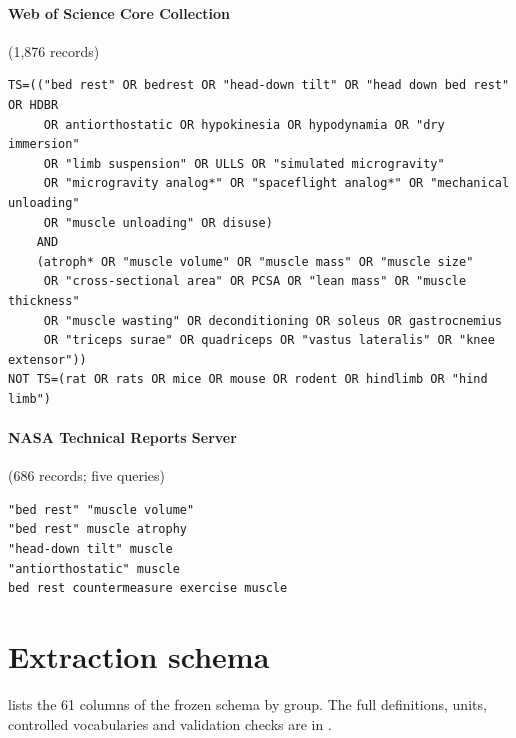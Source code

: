 \paragraph{Web of Science Core Collection} (1,876 records)
{\footnotesize
\begin{verbatim}
TS=(("bed rest" OR bedrest OR "head-down tilt" OR "head down bed rest" OR HDBR
     OR antiorthostatic OR hypokinesia OR hypodynamia OR "dry immersion"
     OR "limb suspension" OR ULLS OR "simulated microgravity"
     OR "microgravity analog*" OR "spaceflight analog*" OR "mechanical unloading"
     OR "muscle unloading" OR disuse)
    AND
    (atroph* OR "muscle volume" OR "muscle mass" OR "muscle size"
     OR "cross-sectional area" OR PCSA OR "lean mass" OR "muscle thickness"
     OR "muscle wasting" OR deconditioning OR soleus OR gastrocnemius
     OR "triceps surae" OR quadriceps OR "vastus lateralis" OR "knee extensor"))
NOT TS=(rat OR rats OR mice OR mouse OR rodent OR hindlimb OR "hind limb")
\end{verbatim}
}

\paragraph{NASA Technical Reports Server} (686 records; five queries)
{\footnotesize
\begin{verbatim}
"bed rest" "muscle volume"
"bed rest" muscle atrophy
"head-down tilt" muscle
"antiorthostatic" muscle
bed rest countermeasure exercise muscle
\end{verbatim}
}

\section{Extraction schema}
\label{app:schema}

 lists the 61 columns of the frozen schema by group. The full definitions, units, controlled
vocabularies and validation checks are in .

